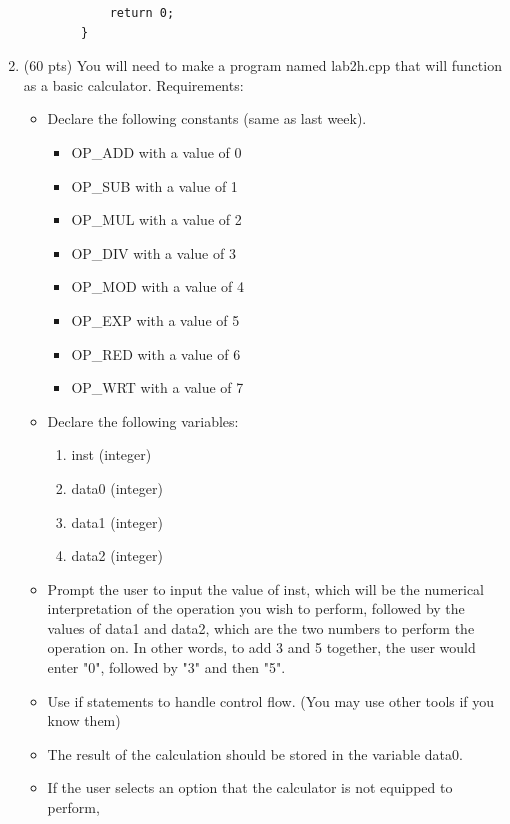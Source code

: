 \documentclass[letterpaper,12pt]{article}
\begin{document}
\begin{enumerate}
\begin{lstlisting}
            return 0;
        }
        \end{lstlisting}
    \item (60 pts) You will need to make a program named lab2h.cpp that will function as a
          basic calculator. Requirements:
        \begin{itemize}
            \item Declare the following constants (same as last week).
            \begin{itemize}
                \item OP\_ADD with a value of 0
                \item OP\_SUB with a value of 1
                \item OP\_MUL with a value of 2
                \item OP\_DIV with a value of 3
                \item OP\_MOD with a value of 4
                \item OP\_EXP with a value of 5
                \item OP\_RED with a value of 6
                \item OP\_WRT with a value of 7
            \end{itemize}
            \item Declare the following variables:
                \begin{enumerate}
                    \item inst (integer)
                    \item data0 (integer)
                    \item data1 (integer)
                    \item data2 (integer)
                \end{enumerate}
            \item Prompt the user to input the value of inst, which will be the numerical
                  interpretation of the operation you wish to perform, followed by the values
                  of data1 and data2, which are the two numbers to perform the operation on.
                  In other words, to add 3 and 5 together, the user would enter "0", followed by
                  "3" and then "5".
            \item Use if statements to handle control flow. (You may use other tools if you know them)
            \item The result of the calculation should be stored in the variable data0.
            \item If the user selects an option that the calculator is not equipped to perform,

\end{itemize}
\end{enumerate}
\end{document}
